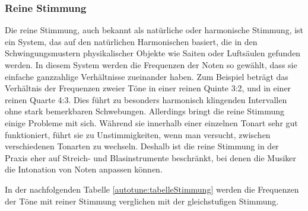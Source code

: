 \subsubsection{Reine Stimmung
\label{autotune:subsubsection:reineStimmung}}
Die reine Stimmung, auch bekannt als natürliche oder harmonische Stimmung, ist ein System,
das auf den natürlichen Harmonischen basiert, die in den Schwingungsmustern physikalischer Objekte wie Saiten oder Luftsäulen gefunden werden.
In diesem System werden die Frequenzen der Noten so gewählt, dass sie einfache ganzzahlige Verhältnisse zueinander haben.
Zum Beispiel beträgt das Verhältnis der Frequenzen zweier Töne in einer reinen Quinte 3:2, und in einer reinen Quarte 4:3.
Dies führt zu besonders harmonisch klingenden Intervallen ohne stark bemerkbaren Schwebungen.
Allerdings bringt die reine Stimmung einige Probleme mit sich.
Während sie innerhalb einer einzelnen Tonart sehr gut funktioniert, führt sie zu Unstimmigkeiten,
wenn man versucht, zwischen verschiedenen Tonarten zu wechseln.
Deshalb ist die reine Stimmung in der Praxis eher auf Streich- und Blasinstrumente beschränkt,
bei denen die Musiker die Intonation von Noten anpassen können.

In der nachfolgenden Tabelle \ref{autotune:tabelleStimmung} werden die Frequenzen der Töne mit reiner Stimmung verglichen mit der gleichstufigen Stimmung.


